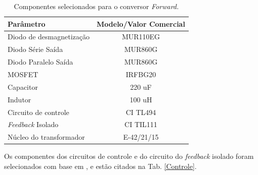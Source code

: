\begin{table}[H]
    \centering
    \footnotesize
    \caption{Componentes selecionados para o conversor \textit{Forward.}}
    \label{Conversor_cc/cc2}
    \begin{adjustbox}{max width = \textwidth}
        \begin{tabular}{|l|c|}
            \hline
            \rowcolor[HTML]{A8DADC}
            Parâmetro & Modelo/Valor Comercial
            \\ \hline
            Diodo de desmagnetização &  MUR110EG
            \\ \hline
            Diodo Série Saída &  MUR860G
            \\ \hline
            Diodo Paralelo Saída & MUR860G
             \\ \hline
              MOSFET & IRFBG20
             \\ \hline
              Capacitor & 220 uF
             \\ \hline
              Indutor & 100 uH
             \\ \hline
              Circuito de controle & CI TL494
             \\ \hline
              \textit{Feedback} Isolado & CI TIL111
             \\ \hline
              Núcleo do transformador & E-42/21/15
             \\ \hline
        \end{tabular}
    \end{adjustbox}
\end{table} 

Os componentes dos circuitos de controle e do circuito do \textit{feedback} isolado foram selecionados com base em \cite{forward2}, e estão citados na Tab. \ref{Controle}.

